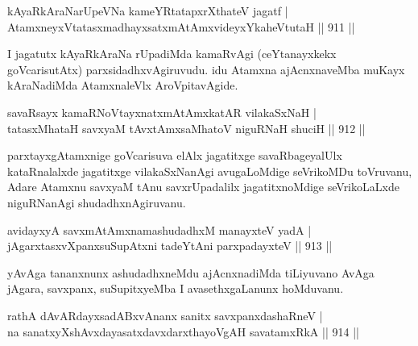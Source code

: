 
\begin{shl}
kAyaRkAraNarUpeVNa kameYRtatapxrXthateV jagatf | \\
AtamxneyxVtatasxmadhayxsatxmAtAmxvideyxYkaheVtutaH \hfill||  911 ||  
\end{shl}

\begin{artha}
I jagatutx kAyaRkAraNa rUpadiMda kamaRvAgi (ceYtanayxkekx goVcarisutAtx) parxsidadhxvAgiruvudu. idu Atamxna ajAcnxnaveMba muKayx kAraNadiMda AtamxnaleVlx AroVpitavAgide.
\end{artha}


\begin{shl}
savaRsayx kamaRNoV\s tayxnatxmAtAmx\s katAR vilakaSxNaH | \\
tatasxMhataH savxyaM tAvxtAmx\s saMhatoV niguRNaH shuciH \hfill||  912 ||  
\end{shl}

\begin{artha}
parxtayxgAtamxnige goVcarisuva elAlx jagatitxge savaRbageyalUlx kataRnalalxde jagatitxge vilakaSxNanAgi avugaLoMdige seVrikoMDu toVruvanu, Adare Atamxnu savxyaM tAnu savxrUpadalilx jagatitxnoMdige seVrikoLaLxde niguRNanAgi shudadhxnAgiruvanu.
\end{artha}


\begin{shl}
avidayxyA savxmAtAmxnamashudadhxM manayxteV yadA | \\
jAgarxtasxvXpanxsuSupAtxni tadeYtAni parxpadayxteV \hfill||  913 ||  
\end{shl}

\begin{artha}
yAvAga tananxnunx ashudadhxneMdu ajAcnxnadiMda tiLiyuvano AvAga jAgara, savxpanx, suSupitxyeMba I avasethxgaLanunx hoMduvanu.
\end{artha}


\begin{shl}
rathA dAvARdayxsadABxvAnanx sanitx savxpanxdashaRneV | \\
na sanatxyXshAvxdayasatxdavxdarxthayoVgAH savatamxRkA \hfill||  914 ||  
\end{shl}
				
